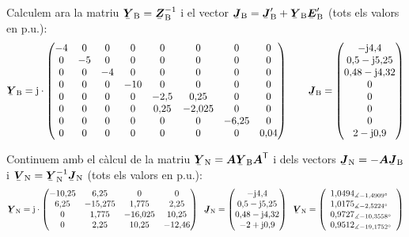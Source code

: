 \begin{exemple}
Calculem ara la matriu $\mcmplx{Y}\ped{B}=\mcmplx{Z}\ped{B}^{-1}$ i el vector $\mcmplx{J}\ped{B} = \mcmplx{J}\ped{B}' + \mcmplx{Y}\ped{B} \mcmplx{E}\ped{B}'$  (tots els valors en p.u.):
\[
   \mcmplx{Y}\ped{B} = \ju \cdot
   \begin{pmatrix}
     -4 & 0 & 0 & 0 & 0 & 0 & 0 & 0 \\
     0 & -5 & 0 & 0 & 0 & 0 & 0 & 0 \\
     0 & 0 & -4 & 0 & 0 & 0 & 0 & 0 \\
     0 & 0 & 0 & -10 & 0 & 0 & 0 & 0 \\
     0 & 0 & 0 & 0 & -2{,}5 & 0{,}25 & 0 & 0 \\
     0 & 0 & 0 & 0 & 0{,}25 & -2{,}025 & 0 & 0 \\
     0 & 0 & 0 & 0 & 0 & 0 & -6{,}25 & 0 \\
     0 & 0 & 0 & 0 & 0 & 0 & 0 & 0{,}04
   \end{pmatrix}
   \qquad
   \mcmplx{J}\ped{B} =
   \begin{pmatrix}
    -\ju 4{,}4 \\
    0{,}5 - \ju 5{,}25 \\
    0{,}48 - \ju 4{,}32 \\
    0 \\
    0 \\
    0 \\
    0 \\
    2 - \ju 0{,}9
   \end{pmatrix}
\]

Continuem amb el c\`{a}lcul de la matriu $\mcmplx{Y}\ped{N} =
\boldsymbol{A} \mcmplx{Y}\ped{B} \transp{\boldsymbol{A}}$ i dels
vectors $\mcmplx{J}\ped{N} = - \boldsymbol{A} \mcmplx{J}\ped{B}$ i
$\mcmplx{V}\ped{N} = \mcmplx{Y}\ped{N}^{-1} \mcmplx{J}\ped{N}$ (tots
els valors en p.u.):
\[
   \mcmplx{Y}\ped{N} = \ju \cdot
   \begin{pmatrix}
     -10{,}25 & 6{,}25 & 0 & 0 \\
     6{,}25 & -15{,}275 & 1{,}775 & 2{,}25 \\
     0 & 1{,}775 & -16{,}025 & 10{,}25 \\
     0 & 2{,}25 & 10{,}25 & -12{,}46
   \end{pmatrix}
   \;\;
   \mcmplx{J}\ped{N} =
   \begin{pmatrix}
    -\ju 4{,}4 \\
    0{,}5 - \ju 5{,}25 \\
    0{,}48 - \ju 4{,}32 \\
    -2 + \ju 0{,}9
   \end{pmatrix}
   \;\;
   \mcmplx{V}\ped{N} =
   \left(\begin{array}{l}
    1{,}0494_{\measuredangle -1{,}4909\degree} \\
    1{,}0175_{\measuredangle -2{,}5224\degree} \\
    0{,}9727_{\measuredangle -10{,}3558\degree} \\
    0{,}9512_{\measuredangle -19{,}1752\degree}
   \end{array}\right)
\]


\end{exemple}
